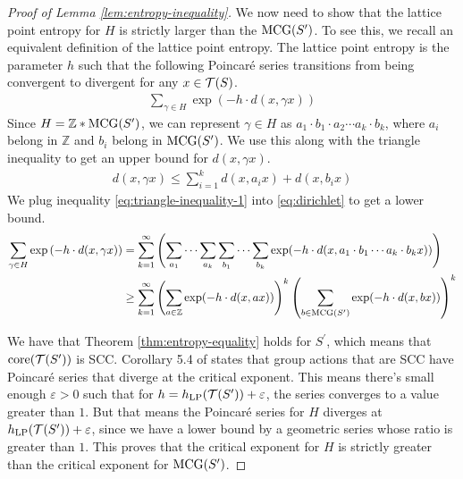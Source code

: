 \documentclass[12pt, reqno]{amsart}
\begin{document}
\begin{proof}[Proof of Lemma \ref{lem:entropy-inequality}]
  We now need to show that the lattice point entropy for $H$ is strictly larger than the $\mathrm{MCG}(S^{\prime})$.
  To see this, we recall an equivalent definition of the lattice point entropy.
  The lattice point entropy is the parameter $h$ such that the following Poincaré series transitions from being convergent to divergent for any $x \in \mathcal{T}(S)$.
  \begin{align}
    \label{eq:dirichlet}
    \sum_{\gamma \in H} \exp\left( -h \cdot d(x, \gamma x) \right)
  \end{align}
  Since $H = \mathbb{Z} * \mathrm{MCG}(S^{\prime})$, we can represent $\gamma \in H$ as $a_1 \cdot b_1 \cdot a_2 \cdots a_k \cdot b_k$, where $a_i$ belong in $\mathbb{Z}$ and $b_i$ belong in $\mathrm{MCG}(S^{\prime})$.
  We use this along with the triangle inequality to get an upper bound for $d(x, \gamma x)$.
  \begin{align}
    \label{eq:triangle-inequality-1}
    d(x, \gamma x) \leq \sum_{i=1}^k d(x, a_i x) + d(x, b_i x)
  \end{align}
  We plug inequality \eqref{eq:triangle-inequality-1} into \eqref{eq:dirichlet} to get a lower bound.
  \begin{align}
    \label{eq:dirichlet-lower-bound}
    \sum_{\gamma \in H} \exp\left( -h \cdot d(x, \gamma x) \right) &= \sum_{k=1}^\infty \left(  \sum_{a_1}\cdots \sum_{a_k} \sum_{b_1}\cdots \sum_{b_k}  \exp(-h \cdot d(x, a_1 \cdot b_1 \cdots a_k \cdot b_k x)) \right) \\
    &\geq \sum_{k=1}^{\infty} \left( \sum_{a \in \mathbb{Z}} \exp(-h \cdot d(x, ax)) \right)^k \left( \sum_{b \in \mathrm{MCG}(S^{\prime})} \exp(-h \cdot d(x, bx)) \right)^k
    \label{eq:dirichlet-lower-bound-2}
  \end{align}

  We have that Theorem \ref{thm:entropy-equality} holds for $S^{\prime}$, which means that $\mathrm{core}(\mathcal{T}(S^{\prime}))$ is SCC.
  Corollary 5.4 of \cite{10.1093/imrn/rny001} states that group actions that are SCC have Poincaré series that diverge at the critical exponent.
  This means there's small enough $\varepsilon > 0$ such that for $h = h_{\mathrm{LP}}(\mathcal{T}(S^{\prime})) + \varepsilon$, the series converges to a value greater than $1$.
  But that means the Poincaré series for $H$ diverges at $h_{\mathrm{LP}}(\mathcal{T}(S^{\prime})) + \varepsilon$, since we have a lower bound by a geometric series whose ratio is greater than $1$.
  This proves that the critical exponent for $H$ is strictly greater than the critical exponent for $\mathrm{MCG}(S^{\prime})$.
\end{proof}
\end{document}
